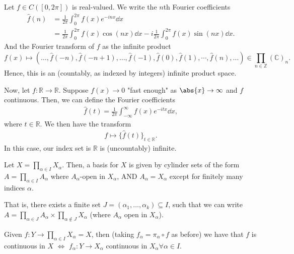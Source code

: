 \begin{example}
    Let $f \in C([0, 2\pi])$ is real-valued. We write the $n$th Fourier coefficients \begin{align*}
    \hat{f}(n) &= \frac{1}{2\pi}\int_0^{2\pi} f(x)e^{-in x}\dd{x}\\
    &=\frac{1}{2\pi}\int_{0}^{2\pi} f(x) \cos(n x) \dd{x} - i \frac{1}{2\pi} \int_{0}^{2\pi} f(x) \sin (n x) \dd{x}.
    \end{align*}
    And the Fourier transform of $f$ as the infinite product \[
    f(x) \mapsto (\dots, \hat{f}(-n), \hat{f}(-n + 1), \dots ,\hat{f}(-1), \hat{f}(0), \hat{f}(1), \cdots, \hat{f}(n), \dots) \in \prod_{n \in \mathbb{Z}}(\mathbb{C})_n.
    \]
    Hence, this is an (countably, as indexed by integers) infinite product space. 

    Now, let $f : \mathbb{R} \to \mathbb{R}$. Suppose $f(x) \to 0$ "fast enough" as $\abs{x} \to \infty$ and $f$ continuous. Then, we can define the Fourier coefficients \begin{align*}
        \hat{f}(t) = \frac{1}{2\pi} \int_{-\infty}^{\infty}f(x)e^{-itx} \dd{x},
    \end{align*}
    where $t \in \mathbb{R}$. We then have the transform \begin{align*}
        f \mapsto \{\hat{f}(t)\}_{t \in \mathbb{R}}.
    \end{align*}
    In this case, our index set is $\mathbb{R}$ is (uncountably) infinite.
\end{example}

\begin{definition}
    Let $X = \prod_{\alpha \in I} X_\alpha$. Then, a basis for $X$ is given by cylinder sets of the form $A = \prod_{\alpha \in I}A_\alpha$ where $A_\alpha$-open in $X_\alpha$, AND $A_\alpha = X_\alpha$ except for finitely many indices $\alpha$.

    That is, there exists a finite set $J = (\alpha_1, \dots, \alpha_k)\subseteq I$, such that we can write $A = \prod_{\alpha \in J}A_\alpha \times \prod_{\alpha \notin J}X_\alpha$ (where $A_\alpha$ open in $X_\alpha$).
\end{definition}

\begin{proposition}
    Given $f: Y \to \prod_{\alpha \in I}X_\alpha = X$, then (taking $f_\alpha = \pi_\alpha \circ f$ as before) we have that $f$ is continuous in $X$ $\iff$ $f_\alpha : Y \to X_\alpha$ continuous in $X_\alpha \forall \alpha \in I$.
\end{proposition}

